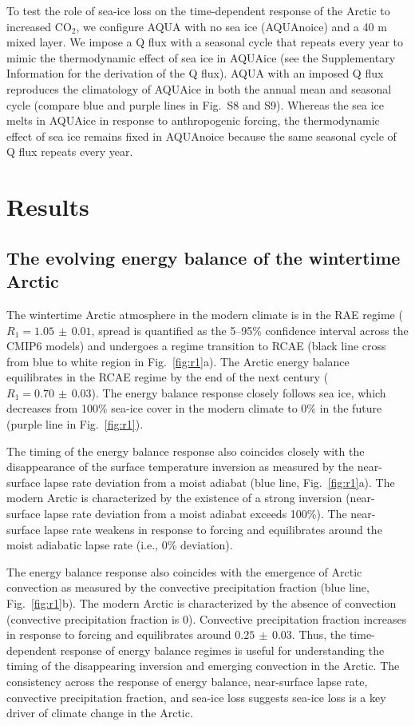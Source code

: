 \documentclass[draft]{agujournal2019}
\begin{document}
To test the role of sea-ice loss on the time-dependent response of the Arctic to increased CO$_2$, we configure AQUA with no sea ice (AQUAnoice) and a 40 m mixed layer. We impose a Q flux with a seasonal cycle that repeats every year to mimic the thermodynamic effect of sea ice in AQUAice (see the Supplementary Information for the derivation of the Q flux). AQUA with an imposed Q flux reproduces the climatology of AQUAice in both the annual mean and seasonal cycle (compare blue and purple lines in Fig.~S8 and S9). Whereas the sea ice melts in AQUAice in response to anthropogenic forcing, the thermodynamic effect of sea ice remains fixed in AQUAnoice because the same seasonal cycle of Q flux repeats every year.


\section{Results}
\label{sec:res}
\subsection{The evolving energy balance of the wintertime Arctic}
\label{sec:r1}
The wintertime Arctic atmosphere in the modern climate is in the RAE regime ($R_1=1.05\,\pm\,0.01$, spread is quantified as the 5--95\% confidence interval across the CMIP6 models) and undergoes a regime transition to RCAE (black line cross from blue to white region in Fig.~\ref{fig:r1}a). The Arctic energy balance equilibrates in the RCAE regime by the end of the next century ($R_1=0.70\,\pm\,0.03$). The energy balance response closely follows sea ice, which decreases from 100\% sea-ice cover in the modern climate to 0\% in the future (purple line in Fig.~\ref{fig:r1}). 

The timing of the energy balance response also coincides closely with the disappearance of the surface temperature inversion as measured by the near-surface lapse rate deviation from a moist adiabat (blue line, Fig.~\ref{fig:r1}a). The modern Arctic is characterized by the existence of a strong inversion (near-surface lapse rate deviation from a moist adiabat exceeds 100\%). The near-surface lapse rate weakens in response to forcing and equilibrates around the moist adiabatic lapse rate (i.e., 0\% deviation).

The energy balance response also coincides with the emergence of Arctic convection as measured by the convective precipitation fraction (blue line, Fig.~\ref{fig:r1}b). The modern Arctic is characterized by the absence of convection (convective precipitation fraction is 0). Convective precipitation fraction increases in response to forcing and equilibrates around $0.25\,\pm\,0.03$. Thus, the time-dependent response of energy balance regimes is useful for understanding the timing of the disappearing inversion and emerging convection in the Arctic. The consistency across the response of energy balance, near-surface lapse rate, convective precipitation fraction, and sea-ice loss suggests sea-ice loss is a key driver of climate change in the Arctic.
\end{document}
